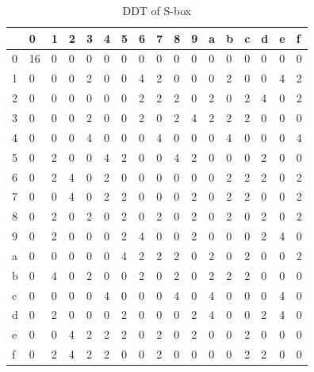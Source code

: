 \documentclass[final]{transcrypto}
\begin{document}
\begin{table}[H]
	\centering
	\caption{DDT of S-box}
	\begin{tabular}{|l||l|l|l|l|l|l|l|l|l|l|l|l|l|l|l|l|}
		\hline
 &  0&	1&	2&	3&	4&	5&	6&	7&	8&	9&	a&	b&	c&	d&	e&	f\\ \hline
 \hline
0& 16 & 0 & 0 & 0 & 0 & 0 & 0 & 0 & 0 & 0 & 0 & 0 & 0 & 0 & 0 & 0 \\ \hline
1& 0 & 0 & 0 & 2 & 0 & 0 & 4 & 2 & 0 & 0 & 0 & 2 & 0 & 0 & 4 & 2 \\ \hline
2& 0 & 0 & 0 & 0 & 0 & 0 & 2 & 2 & 2 & 0 & 2 & 0 & 2 & 4 & 0 & 2 \\ \hline
3& 0 & 0 & 0 & 2 & 0 & 0 & 2 & 0 & 2 & 4 & 2 & 2 & 2 & 0 & 0 & 0  \\ \hline 
4& 0 & 0 & 0 & 4 & 0 & 0 & 0 & 4 & 0 & 0 & 0 & 4 & 0 & 0 & 0 & 4  \\ \hline
5& 0 & 2 & 0 & 0 & 4 & 2 & 0 & 0 & 4 & 2 & 0 & 0 & 0 & 2 & 0 & 0  \\ \hline
6& 0 & 2 & 4 & 0 & 2 & 0 & 0 & 0 & 0 & 0 & 0 & 2 & 2 & 2 & 0 & 2  \\ \hline
7& 0 & 0 & 4 & 0 & 2 & 2 & 0 & 0 & 0 & 2 & 0 & 2 & 2 & 0 & 0 & 2  \\ \hline
8& 0 & 2 & 0 & 2 & 0 & 2 & 0 & 2 & 0 & 2 & 0 & 2 & 0 & 2 & 0 & 2  \\ \hline
9& 0 & 2 & 0 & 0 & 0 & 2 & 4 & 0 & 0 & 2 & 0 & 0 & 0 & 2 & 4 & 0  \\ \hline
a& 0 & 0 & 0 & 0 & 0 & 4 & 2 & 2 & 2 & 0 & 2 & 0 & 2 & 0 & 0 & 2  \\ \hline
b& 0 & 4 & 0 & 2 & 0 & 0 & 2 & 0 & 2 & 0 & 2 & 2 & 2 & 0 & 0 & 0  \\ \hline
c& 0 & 0 & 0 & 0 & 4 & 0 & 0 & 0 & 4 & 0 & 4 & 0 & 0 & 0 & 4 & 0  \\ \hline
d& 0 & 2 & 0 & 0 & 0 & 2 & 0 & 0 & 0 & 2 & 4 & 0 & 0 & 2 & 4 & 0  \\ \hline
e& 0 & 0 & 4 & 2 & 2 & 2 & 0 & 2 & 0 & 2 & 0 & 0 & 2 & 0 & 0 & 0  \\ \hline
f& 0 & 2 & 4 & 2 & 2 & 0 & 0 & 2 & 0 & 0 & 0 & 0 & 2 & 2 & 0 & 0 \\ \hline
	\end{tabular}
\end{table}
\end{document}
